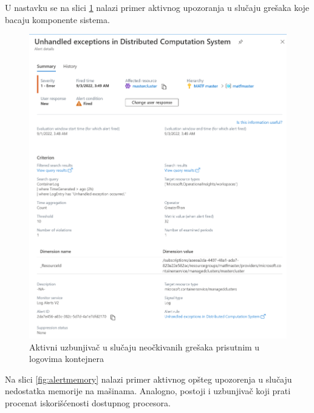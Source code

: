 \documentclass[12pt,oneside]{memoir}
\begin{document}
U nastavku se na slici \ref{fig:alertex} nalazi primer aktivnog upozoranja u slučaju grešaka koje bacaju komponente sistema.

\begin{figure}[!ht]
  \centering
  \includegraphics[width=1\textwidth]{./images/alert_unhandled_exceptions.png}
  \caption{Aktivni uzbunjivač u slučaju neočkivanih grešaka prisutnim u logovima kontejnera}
  \label{fig:alertex}
\end{figure}

Na slici \ref{fig:alertmemory} nalazi primer aktivnog opšteg upozorenja u slučaju nedostatka memorije na mašinama. Analogno, postoji i uzbunjivač koji prati procenat iskorišćenosti dostupnog procesora.
\end{document}
